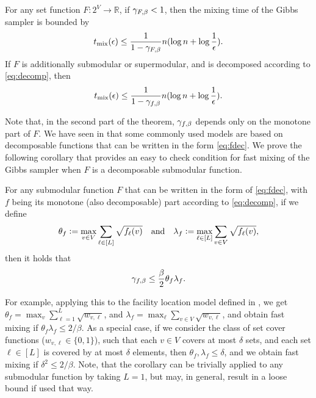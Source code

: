 \begin{theorem} \label{thm:fast}
  For any set function $F : 2^V \to \mathbb{R}$, if $\gamma_{F,\beta} < 1$, then the mixing time of the Gibbs sampler is bounded by
  \begin{align*}
  	t_{\mathrm{mix}}(\epsilon) \leq \frac{1}{1 - \gamma_{F,\beta}}n(\log n + \log \frac{1}{\epsilon}).
  \end{align*}
  If $F$ is additionally submodular or supermodular, and is decomposed according to \eqref{eq:decomp}, then
  \begin{align*}
  	t_{\mathrm{mix}}(\epsilon) \leq \frac{1}{1 - \gamma_{f,\beta}}n(\log n + \log \frac{1}{\epsilon}).
  \end{align*}
\end{theorem}
Note that, in the second part of the theorem, $\gamma_{f,\beta}$ depends only on the monotone part of $F$. 
We have seen in  that some commonly used models are based on decomposable functions that can be written in the form \eqref{eq:fdec}.
We prove the following corollary that provides an easy to check condition for fast mixing of the Gibbs sampler when $F$ is a decomposable submodular function.

\begin{cor} \label{cor:fast}
  For any submodular function $F$ that can be written in the form of \eqref{eq:fdec}, with $f$ being its monotone (also decomposable) part according to \eqref{eq:decomp}, if we define
  \begin{align*}
  	\theta_f \vcentcolon= \max_{v \in V} \sum_{\ell \in [L]} \sqrt{f_{\ell}(v)} \hspace{1em}\textrm{and}\hspace{1em} \lambda_f \vcentcolon= \max_{\ell \in [L]} \sum_{v \in V} \sqrt{f_{\ell}(v)},
  \end{align*}
  then it holds that
  \begin{align*}
  	\gamma_{f,\beta} \leq \frac{\beta}{2} \theta_f \lambda_f.
  \end{align*}
\end{cor}

For example, applying this to the facility location model defined in , we get $\theta_f = \max_{v} \sum_{\ell = 1}^L \sqrt{w_{v, \ell}}$, and $\lambda_f = \max_{\ell} \sum_{v \in V} \sqrt{w_{v, \ell}}$, and obtain fast mixing if $\theta_f \lambda_f \leq 2/\beta$.
As a special case, if we consider the class of set cover functions ($w_{v, \ell} \in \{0, 1\}$), such that each $v \in V$ covers at most $\delta$ sets, and each set $\ell \in [L]$ is covered by at most $\delta$ elements, then $\theta_f, \lambda_f \leq \delta$, and we obtain fast mixing if $\delta^2 \leq 2/\beta$.
Note, that the corollary can be trivially applied to any submodular function by taking $L=1$, but may, in general, result in a loose bound if used that way.

